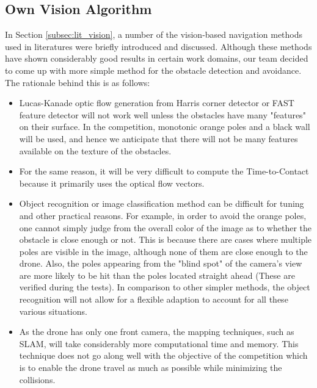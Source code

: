 \subsection{Own Vision Algorithm}
\label{subsec:our_vision}
In Section \ref{subsec:lit_vision}, a number of the vision-based navigation methods used in literatures were briefly introduced and discussed. Although these methods have shown considerably good results in certain work domains, our team decided to come up with more simple method for the obstacle detection and avoidance. The rationale behind this is as follows:
\begin{itemize}
	\item Lucas-Kanade optic flow generation from Harris corner detector or FAST feature detector will not work well unless the obstacles have many "features" on their surface. In the competition, monotonic orange poles and a black wall will be used, and hence we anticipate that there will not be many features available on the texture of the obstacles.
	\item For the same reason, it will be very difficult to compute the Time-to-Contact because it primarily uses the optical flow vectors.
	\item Object recognition or image classification  method can be difficult for tuning and other practical reasons. For example, in order to avoid the orange poles, one cannot simply judge from the overall color of the image as to whether the obstacle is close enough or not. This is because there are cases where multiple poles are visible in the image, although none of them are close enough to the drone. Also, the poles appearing from the "blind spot" of the camera's view are more likely to be hit than the poles located straight ahead (These are verified during the tests). In comparison to other simpler methods, the object recognition will not allow for a flexible adaption to account for all these various situations.
	\item As the drone has only one front camera, the mapping techniques, such as SLAM, will take considerably more computational time and memory. This technique does not go along well with the objective of the competition which is to enable the drone travel as much as possible while minimizing the collisions.
\end{itemize}

